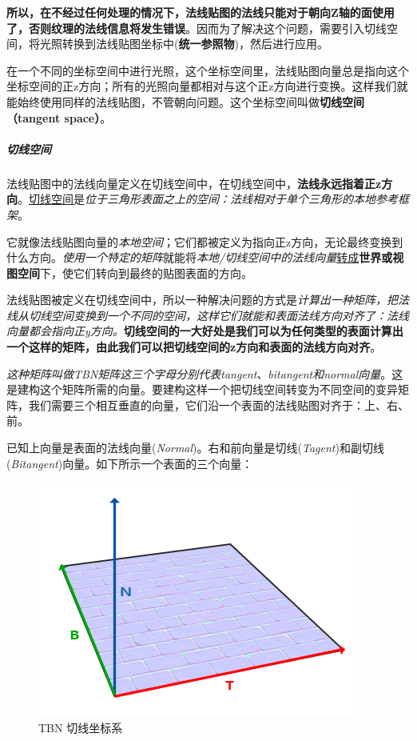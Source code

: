 \documentclass[UTF8,a4paper,12pt]{ctexbook}
\begin{document}
					\textbf{所以，在不经过任何处理的情况下，法线贴图的法线只能对于朝向Z轴的面使用了，否则纹理的法线信息将发生错误}。因而为了解决这个问题，需要引入切线空间，将光照转换到法线贴图坐标中(\textbf{统一参照物})，然后进行应用。
					
					在一个不同的坐标空间中进行光照，这个坐标空间里，法线贴图向量总是指向这个坐标空间的正z方向；所有的光照向量都相对与这个正z方向进行变换。这样我们就能始终使用同样的法线贴图，不管朝向问题。这个坐标空间叫做\textbf{切线空间（tangent space）}。
					
				\subparagraph{切线空间}
					法线贴图中的法线向量定义在切线空间中，在切线空间中，\textbf{法线永远指着正z方向}。\underline{切线空间}是\textit{位于三角形表面之上的空间：法线相对于单个三角形的本地参考框架}。
					
					它就像法线贴图向量的\textit{本地空间}；它们都被定义为指向正z方向，无论最终变换到什么方向。\textit{使用一个特定的矩阵}就能将\textit{本地/切线空间中的法线向量}\underline{转成}\textbf{世界或视图空间}下，使它们转向到最终的贴图表面的方向。
					
					法线贴图被定义在切线空间中，所以一种解决问题的方式是\textit{计算出一种矩阵，把法线从切线空间变换到一个不同的空间，这样它们就能和表面法线方向对齐了：法线向量都会指向正y方向。}\textbf{切线空间的一大好处是我们可以为任何类型的表面计算出一个这样的矩阵，由此我们可以把切线空间的z方向和表面的法线方向对齐}。
					
					\textit{这种矩阵叫做TBN矩阵这三个字母分别代表tangent、bitangent和normal向量}。这是建构这个矩阵所需的向量。要建构这样一个把切线空间转变为不同空间的变异矩阵，我们需要三个相互垂直的向量，它们沿一个表面的法线贴图对齐于：上、右、前。
					
					已知上向量是表面的法线向量(\textit{Normal})。右和前向量是切线(\textit{Tagent})和副切线(\textit{Bitangent})向量。如下所示一个表面的三个向量：
					\begin{figure}[H]
						\centering
						\includegraphics[width=.55\linewidth]{TBN}
						\caption{TBN 切线坐标系}
					\end{figure}
					
\end{document}
